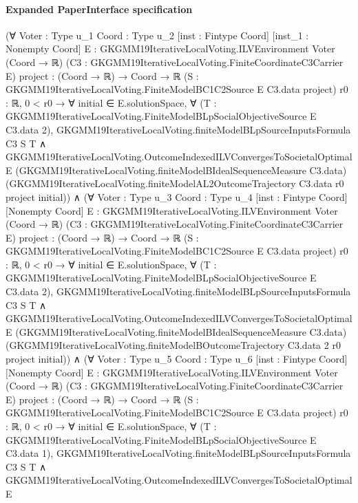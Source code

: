 \documentclass[10pt]{article}
\begin{document}
\paragraph{Expanded PaperInterface specification}
\begin{ReviewVerbatim}
(∀ {Voter : Type u_1} {Coord : Type u_2} [inst : Fintype Coord] [inst_1 : Nonempty Coord]
    {E : GKGMM19IterativeLocalVoting.ILVEnvironment Voter (Coord → ℝ)}
    (C3 : GKGMM19IterativeLocalVoting.FiniteCoordinateC3Carrier E) {project : (Coord → ℝ) → Coord → ℝ}
    (S : GKGMM19IterativeLocalVoting.FiniteModelBC1C2Source E C3.data project) {r0 : ℝ},
    0 < r0 →
      ∀ initial ∈ E.solutionSpace,
        ∀ (T : GKGMM19IterativeLocalVoting.FiniteModelBLpSocialObjectiveSource E C3.data 2),
          GKGMM19IterativeLocalVoting.finiteModelBLpSourceInputsFormula C3 S T ∧
            GKGMM19IterativeLocalVoting.OutcomeIndexedILVConvergesToSocietalOptimal E
              (GKGMM19IterativeLocalVoting.finiteModelBIdealSequenceMeasure C3.data)
              (GKGMM19IterativeLocalVoting.finiteModelAL2OutcomeTrajectory C3.data r0 project initial)) ∧
  (∀ {Voter : Type u_3} {Coord : Type u_4} [inst : Fintype Coord] [Nonempty Coord]
      {E : GKGMM19IterativeLocalVoting.ILVEnvironment Voter (Coord → ℝ)}
      (C3 : GKGMM19IterativeLocalVoting.FiniteCoordinateC3Carrier E) {project : (Coord → ℝ) → Coord → ℝ}
      (S : GKGMM19IterativeLocalVoting.FiniteModelBC1C2Source E C3.data project) {r0 : ℝ},
      0 < r0 →
        ∀ initial ∈ E.solutionSpace,
          ∀ (T : GKGMM19IterativeLocalVoting.FiniteModelBLpSocialObjectiveSource E C3.data 2),
            GKGMM19IterativeLocalVoting.finiteModelBLpSourceInputsFormula C3 S T ∧
              GKGMM19IterativeLocalVoting.OutcomeIndexedILVConvergesToSocietalOptimal E
                (GKGMM19IterativeLocalVoting.finiteModelBIdealSequenceMeasure C3.data)
                (GKGMM19IterativeLocalVoting.finiteModelBOutcomeTrajectory C3.data 2 r0 project initial)) ∧
    (∀ {Voter : Type u_5} {Coord : Type u_6} [inst : Fintype Coord] [Nonempty Coord]
        {E : GKGMM19IterativeLocalVoting.ILVEnvironment Voter (Coord → ℝ)}
        (C3 : GKGMM19IterativeLocalVoting.FiniteCoordinateC3Carrier E) {project : (Coord → ℝ) → Coord → ℝ}
        (S : GKGMM19IterativeLocalVoting.FiniteModelBC1C2Source E C3.data project) {r0 : ℝ},
        0 < r0 →
          ∀ initial ∈ E.solutionSpace,
            ∀ (T : GKGMM19IterativeLocalVoting.FiniteModelBLpSocialObjectiveSource E C3.data 1),
              GKGMM19IterativeLocalVoting.finiteModelBLpSourceInputsFormula C3 S T ∧
                GKGMM19IterativeLocalVoting.OutcomeIndexedILVConvergesToSocietalOptimal E

\end{ReviewVerbatim}
\end{document}
